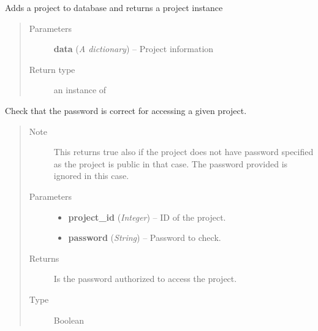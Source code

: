 \documentclass[letterpaper,10pt,english]{sphinxmanual}
\begin{document}

\begin{fulllineitems}
\label{controller:controller.project.add_project}
Adds a project to database and returns a  project instance
\begin{quote}\begin{description}
\item[{Parameters}] \leavevmode
\textbf{data} (\emph{A dictionary}) -- Project information

\item[{Return type}] \leavevmode
an instance of {\hyperref[models:models.Project]{}}

\end{description}\end{quote}

\end{fulllineitems}


\begin{fulllineitems}
\label{controller:controller.project.check_password}
Check that the password is correct for accessing a given project.
\begin{quote}\begin{description}
\item[{Note }] \leavevmode
This returns true also if the project does not have password
specified as the project is public in that case. The password
provided is ignored in this case.

\item[{Parameters}] \leavevmode\begin{itemize}
\item {} 
\textbf{project\_id} (\emph{Integer}) -- ID of the project.

\item {} 
\textbf{password} (\emph{String}) -- Password to check.

\end{itemize}

\item[{Returns}] \leavevmode
Is the password authorized to access the project.

\item[{Type }] \leavevmode
Boolean

\end{description}\end{quote}

\end{fulllineitems}
\end{document}
